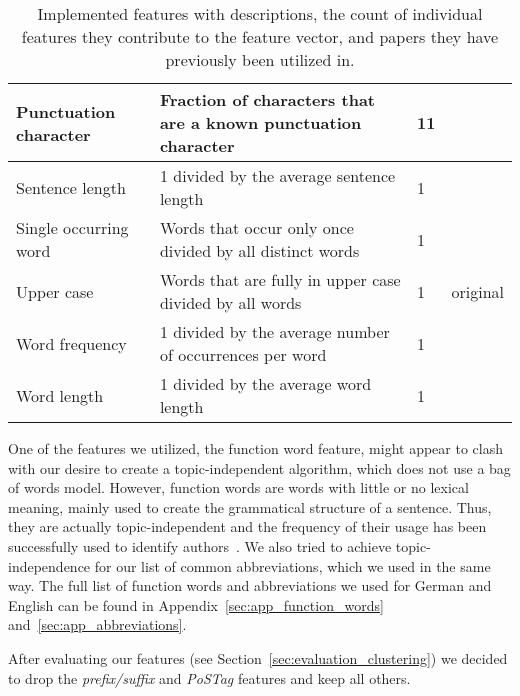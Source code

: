 \begin{savenotes}
\begin{table}[ht!]
\begin{center}
\begin{tabular}{p{2.6cm}|p{6cm}|p{1.2cm}|p{1.2cm}}
    Punctuation character   & Fraction of characters that are a known punctuation character             & 11                & \cite{madigan2005author} \cite{narayanan2012feasibility}\\ \hline
    Sentence length          & 1 divided by the average sentence length                                  & 1                 & \cite{de2001mining}\\ \hline
    Single occurring word    & Words that occur only once divided by all distinct words                  & 1                 & \cite{madigan2005author} \cite{narayanan2012feasibility}\\ \hline
    Upper case           & Words that are fully in upper case divided by all words                   & 1                 & original\\ \hline
    Word frequency           & 1 divided by the average number of occurrences per word                   & 1                 & \cite{madigan2005author} \cite{narayanan2012feasibility}\\ \hline
    Word length              & 1 divided by the average word length                                      & 1                 & \cite{argamon2003style} \cite{narayanan2012feasibility}\\
    \end{tabular}
    \end{center}
    \caption{Implemented features with descriptions, the count of individual features they contribute to the feature vector, and papers they have previously been utilized in.}
    \label{tab:featureTable}
\end{table}


One of the features we utilized, the function word feature, might appear to clash with our desire to create a topic-independent algorithm, which does not use a bag of words model.
However, function words are words with little or no lexical meaning, mainly used to create the grammatical structure of a sentence.
Thus, they are actually topic-independent and the frequency of their usage has been successfully used to identify authors~\cite{mosteller1962applied}.
We also tried to achieve topic-independence for our list of common abbreviations, which we used in the same way.
The full list of function words and abbreviations we used for German and English can be found in Appendix~\ref{sec:app_function_words} and~\ref{sec:app_abbreviations}.

\end{savenotes}

After evaluating our features (see Section~\ref{sec:evaluation_clustering}) we decided to drop the \textit{prefix/suffix} and \textit{PoSTag} features and keep all others.



